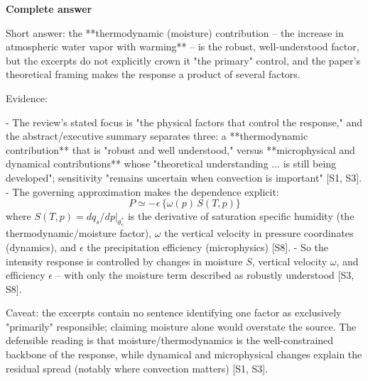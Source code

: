 \documentclass[10pt]{article}
\begin{document}
\textbf{Complete answer}
\begin{AnswerText}
Short answer: the **thermodynamic (moisture) contribution -- the increase in atmospheric water vapor with warming** -- is the robust, well-understood factor, but the excerpts do not explicitly crown it "the primary" control, and the paper's theoretical framing makes the response a product of several factors.

Evidence:

- The review's stated focus is "the physical factors that control the response," and the abstract/executive summary separates three: a **thermodynamic contribution** that is "robust and well understood," versus **microphysical and dynamical contributions** whose "theoretical understanding ... is still being developed"; sensitivity "remains uncertain when convection is important" [S1, S3].
- The governing approximation makes the dependence explicit:  
  $$P \simeq -\epsilon\,\{\omega(p)\,S(T,p)\}$$  
  where $S(T,p)=dq_s/dp|_{\theta_e^*}$ is the derivative of saturation specific humidity (the thermodynamic/moisture factor), $\omega$ the vertical velocity in pressure coordinates (dynamics), and $\epsilon$ the precipitation efficiency (microphysics) [S8].
- So the intensity response is controlled by changes in moisture $S$, vertical velocity $\omega$, and efficiency $\epsilon$ -- with only the moisture term described as robustly understood [S3, S8].

Caveat: the excerpts contain no sentence identifying one factor as exclusively "primarily" responsible; claiming moisture alone would overstate the source. The defensible reading is that moisture/thermodynamics is the well-constrained backbone of the response, while dynamical and microphysical changes explain the residual spread (notably where convection matters) [S1, S3].
\end{AnswerText}
\end{document}
